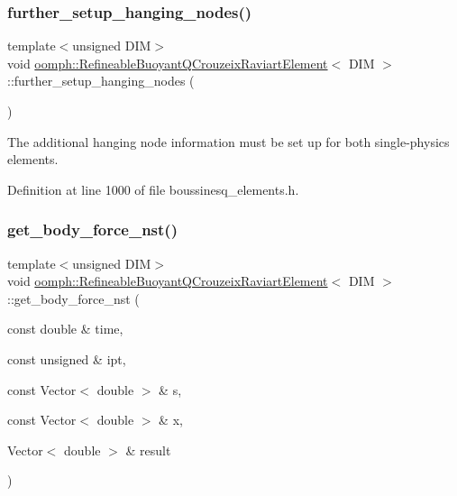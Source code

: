 \subsubsection{\texorpdfstring{further\+\_\+setup\+\_\+hanging\+\_\+nodes()}{further\_setup\_hanging\_nodes()}}
{\footnotesize\ttfamily template$<$unsigned D\+IM$>$ \\
void \hyperlink{classoomph_1_1RefineableBuoyantQCrouzeixRaviartElement}{oomph\+::\+Refineable\+Buoyant\+Q\+Crouzeix\+Raviart\+Element}$<$ D\+IM $>$\+::further\+\_\+setup\+\_\+hanging\+\_\+nodes (\begin{DoxyParamCaption}{ }\end{DoxyParamCaption})\hspace{0.3cm}{\ttfamily [inline]}}



The additional hanging node information must be set up for both single-\/physics elements. 



Definition at line 1000 of file boussinesq\+\_\+elements.\+h.

\mbox{\label{classoomph_1_1RefineableBuoyantQCrouzeixRaviartElement_a69fb9113989d692dd55eb1983cdbc93b}} 
\subsubsection{\texorpdfstring{get\+\_\+body\+\_\+force\+\_\+nst()}{get\_body\_force\_nst()}}
{\footnotesize\ttfamily template$<$unsigned D\+IM$>$ \\
void \hyperlink{classoomph_1_1RefineableBuoyantQCrouzeixRaviartElement}{oomph\+::\+Refineable\+Buoyant\+Q\+Crouzeix\+Raviart\+Element}$<$ D\+IM $>$\+::get\+\_\+body\+\_\+force\+\_\+nst (\begin{DoxyParamCaption}\item[{const double \&}]{time,  }\item[{const unsigned \&}]{ipt,  }\item[{const Vector$<$ double $>$ \&}]{s,  }\item[{const Vector$<$ double $>$ \&}]{x,  }\item[{Vector$<$ double $>$ \&}]{result }\end{DoxyParamCaption})\hspace{0.3cm}{\ttfamily [inline]}}



